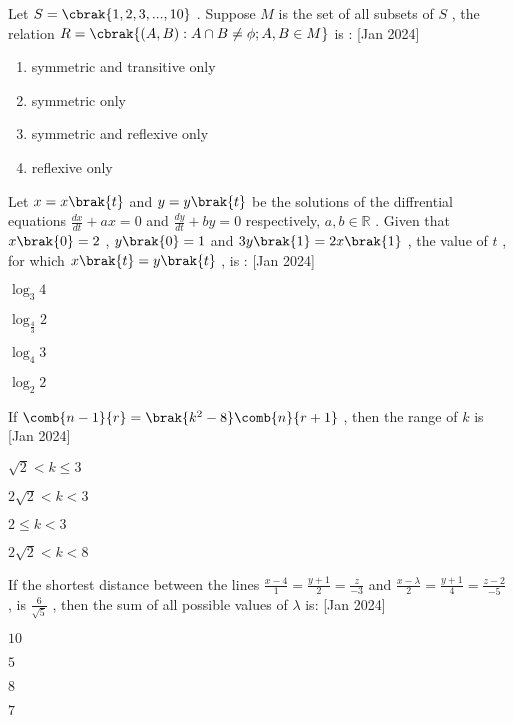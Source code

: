 \item Let $S=\cbrak{1,2,3,...,10}$  . Suppose $ M $ is the set of all subsets of $ S $ , the relation $R=\cbrak{ (A,B):A \cap B \neq \phi ;A,B \in M }$ is : \hfill{[Jan 2024]}
\begin{enumerate}
\item symmetric and transitive only 
\item symmetric only 
\item symmetric and reflexive only 
\item reflexive only 
\end{enumerate}
\item Let $x=x\brak{t}$ and $y=y\brak{t}$ be the solutions of the diffrential equations $\frac{dx}{dt}+ax=0$ and $\frac{dy}{dt}+by=0$ respectively, $a,b \in \mathbb{R}$ . Given that $x\brak{0}=2$ , $y\brak{0}=1$ and $3y\brak{1}=2x\brak{1}$ , the value of $t$ , for which $x\brak{t}=y\brak{t}$ , is :  \hfill{[Jan 2024]}
\begin{enumerate}   
\begin{multicols}{2}
\item $ \log_3 4 $
\item $ \log_{\frac{4}{3}} 2 $
\item $ \log_4 3 $
\item $ \log_2 2 $
\end{multicols}
\end{enumerate}
\item If $\comb{n-1}{r} = \brak{k^2 - 8}\comb{n}{r+1}$ , then the range of $k$ is \hfill{[Jan 2024]}
\begin{enumerate}
\begin{multicols}{2}
\item $ \sqrt{2}<k \leq 3 $
\item $ 2\sqrt{2}<k<3 $
\item $ 2 \leq k<3 $
\item $ 2\sqrt{2}<k<8 $
\end{multicols}
\end{enumerate}
\item If the shortest distance between the lines $\frac{x-4}{1}=\frac{y+1}{2}=\frac{z}{-3}$ and $\frac{x-\lambda}{2}=\frac{y+1}{4}=\frac{z-2}{-5}$ , is $\frac{6}{\sqrt{5}}$ , then the sum of all possible values of $\lambda$ is: \hfill{[Jan 2024]}
\begin{enumerate}   
\begin{multicols}{4}
\item $10$
\item $5$
\item $8$
\item $7$                                                                        
\end{multicols}
\end{enumerate}
